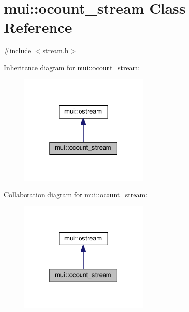 \hypertarget{classmui_1_1ocount__stream}{}\section{mui\+:\+:ocount\+\_\+stream Class Reference}
\label{classmui_1_1ocount__stream}


{\ttfamily \#include $<$stream.\+h$>$}



Inheritance diagram for mui\+:\+:ocount\+\_\+stream\+:
\nopagebreak
\begin{figure}[H]
\begin{center}
\leavevmode
\includegraphics[width=183pt]{classmui_1_1ocount__stream__inherit__graph}
\end{center}
\end{figure}


Collaboration diagram for mui\+:\+:ocount\+\_\+stream\+:
\nopagebreak
\begin{figure}[H]
\begin{center}
\leavevmode
\includegraphics[width=183pt]{classmui_1_1ocount__stream__coll__graph}
\end{center}
\end{figure}
